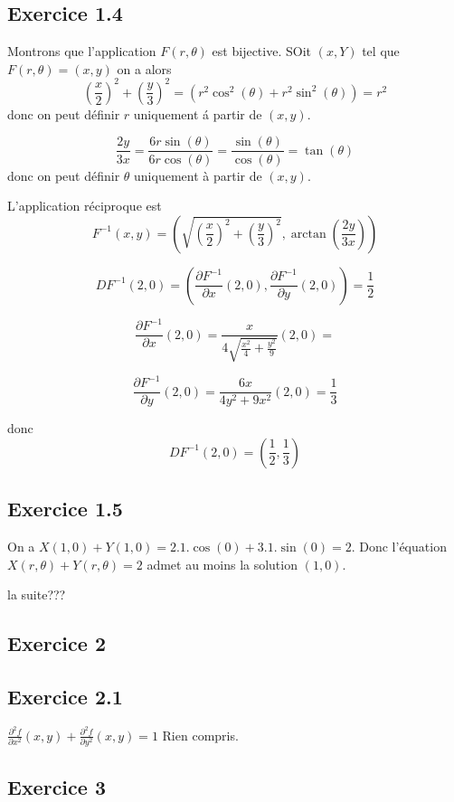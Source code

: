 \documentclass[]{book}
\theoremstyle{definition}
\begin{document}
\subsection*{Exercice 1.4}

Montrons que l'application $F(r,\theta)$ est bijective. SOit $(x,Y)$ tel que $F(r,\theta) = (x,y)$ on a alors 
$$
\left(\frac{x}{2}\right)^2+\left(\frac{y}{3}\right)^2 = (r^2\cos^2(\theta) + r^2\sin^2(\theta)) = r^2 
$$
donc on peut d\'efinir $r$ uniquement \'a partir de $(x,y)$. 


$$
\frac{2y}{3x} = \frac{6r\sin(\theta)}{6r\cos(\theta)} = \frac{\sin(\theta)}{\cos(\theta)} = \tan(\theta)
$$
donc on peut d\'efinir $\theta$ uniquement \`a partir de $(x,y)$. 

L'application r\'eciproque est 
$$
F^{-1}(x,y) = \left(\sqrt{\left(\frac{x}{2}\right)^2+\left(\frac{y}{3}\right)^2}, \arctan \left(\frac{2y}{3x}\right) \right)
$$

$$
    DF^{-1}(2,0) = \left( \frac{\partial F^{-1}}{\partial x}(2,0),  \frac{\partial F^{-1}}{\partial y}(2,0)\right) = \frac{1}{2}
$$

$$
\frac{\partial F^{-1}}{\partial x}(2,0) = \frac{x}{4\sqrt{ \frac{x^2}{4}+\frac{y^2}{9}}}(2,0) = 
$$

$$
\frac{\partial F^{-1}}{\partial y}(2,0) = \frac{6x}{4y^2+9x^2}(2,0) = \frac{1}{3}
$$

donc
$$
DF^{-1}(2,0) = \left(\frac{1}{2}, \frac{1}{3}\right)
$$


\subsection*{Exercice 1.5}
On a $X(1,0) + Y(1,0) = 2.1.\cos(0) + 3.1.\sin(0) = 2$. Donc l'\'equation $X(r,\theta)+Y(r,\theta) = 2$ admet au moins la solution $(1,0)$.

la suite???


\subsection*{Exercice 2}
\subsection*{Exercice 2.1}

$\frac{\partial^2 f}{\partial x^2}(x,y) +  \frac{\partial^2 f}{\partial y^2}(x,y) = 1$
Rien compris.

\subsection*{Exercice 3}
\end{document}
